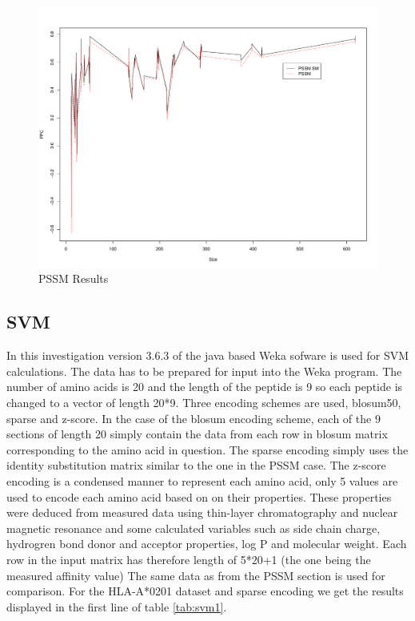 \begin{figure}
\begin{center}
\includegraphics[width=12cm]{fig/pssm1.pdf}
\caption{PSSM Results}\label{fig:pssm1}
\end{center}
\end{figure}

\subsection*{SVM}
In this investigation version 3.6.3 of the java based Weka sofware is used for SVM calculations.
The data has to be prepared for input into the Weka program.
The number of amino acids is 20 and the length of the peptide is 9 so each peptide is changed to a vector of length 20*9. 
Three encoding schemes are used, blosum50, sparse and z-score. 
In the case of the blosum encoding scheme, each of the 9 sections of length 20 simply contain the data from each row in blosum matrix corresponding to the amino acid in question.
The sparse encoding simply uses the identity substitution matrix similar to the one in the PSSM case. 
The z-score encoding is a condensed manner to represent each amino acid, only 5 values are used to encode each amino acid based on on their properties. 
These properties were deduced from measured data using thin-layer chromatography and nuclear magnetic resonance and some calculated variables 
such as side chain charge, hydrogren bond donor and acceptor properties, log P and molecular weight. 
Each row in the input matrix has therefore length of 5*20+1 (the one being the measured affinity value)
The same data as from the PSSM section is used for comparison. For the HLA-A*0201 dataset and sparse encoding we get the results displayed in the first line of table \ref{tab:svm1}.

